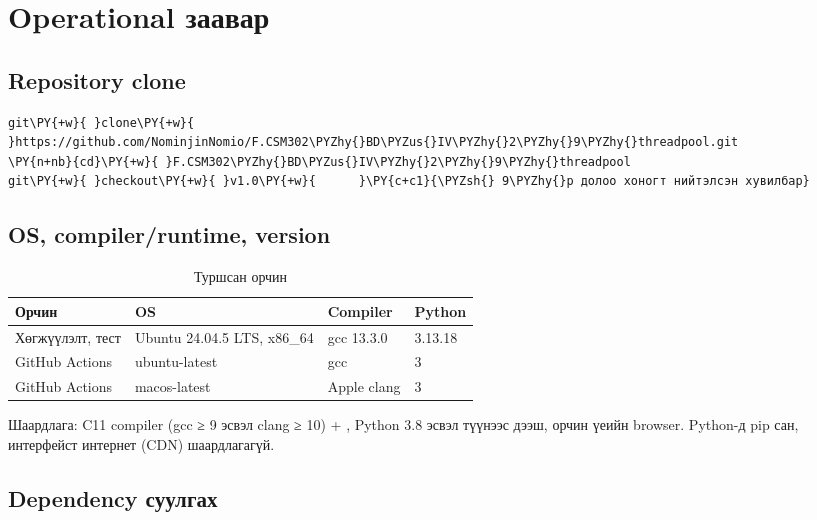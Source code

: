 \documentclass[12pt,a4paper]{article}
\begin{document}
\section{Operational заавар}

\subsection{Repository clone}

\par\noindent\begin{minipage}{\linewidth}\setlength{\topsep}{1pt}\setlength{\partopsep}{0pt}
\begin{Verbatim}[commandchars=\\\{\}]
git\PY{+w}{ }clone\PY{+w}{ }https://github.com/NominjinNomio/F.CSM302\PYZhy{}BD\PYZus{}IV\PYZhy{}2\PYZhy{}9\PYZhy{}threadpool.git
\PY{n+nb}{cd}\PY{+w}{ }F.CSM302\PYZhy{}BD\PYZus{}IV\PYZhy{}2\PYZhy{}9\PYZhy{}threadpool
git\PY{+w}{ }checkout\PY{+w}{ }v1.0\PY{+w}{      }\PY{c+c1}{\PYZsh{} 9\PYZhy{}р долоо хоногт нийтэлсэн хувилбар}
\end{Verbatim}
\end{minipage}

\subsection{OS, compiler/runtime, version}

\begin{table}[H]
\centering
\caption{Туршсан орчин}\label{tab:env}
\begin{tabular}{|P{0.220}|P{0.320}|P{0.280}|P{0.180}|}
\hline
{} \textbf{Орчин} & \textbf{OS} & \textbf{Compiler} & \textbf{Python} \\ \hline
Хөгжүүлэлт, тест & Ubuntu 24.04.5 LTS, x86\_64 & gcc 13.3.0 & 3.13.18 \\ \hline
GitHub Actions & ubuntu-latest & gcc & 3 \\ \hline
GitHub Actions & macos-latest & Apple clang & 3 \\ \hline
\end{tabular}
\end{table}

Шаардлага: C11 compiler (gcc ≥ 9 эсвэл clang ≥ 10) + , Python 3.8 эсвэл түүнээс дээш, орчин үеийн browser. Python-д pip сан, интерфейст интернет (CDN) шаардлагагүй.

\subsection{Dependency суулгах}
\end{document}
